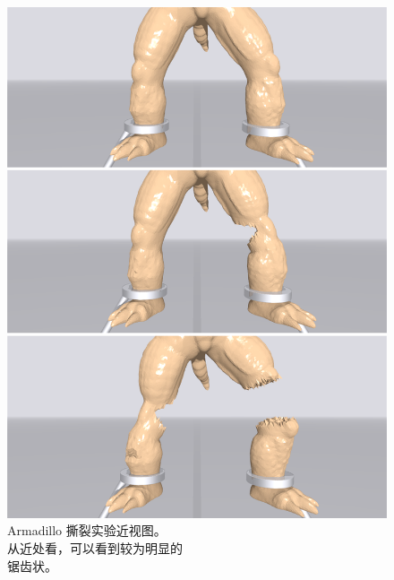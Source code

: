 \begin{figure}[htbp]
\centering
\begin{minipage}[t]{0.45\textwidth}
\flushleft

  \includegraphics[width=0.9\linewidth]{chap/image/demo_tear_armadillo_close_view}
  \caption{\label{demo_tear_armadillo_close_view}
           Armadillo 撕裂实验近视图。\\从近处看，可以看到较为明显的\\锯齿状。
          }

\end{minipage}
\begin{minipage}[t]{0.45\textwidth}
\flushright


\end{minipage}
\end{figure}
